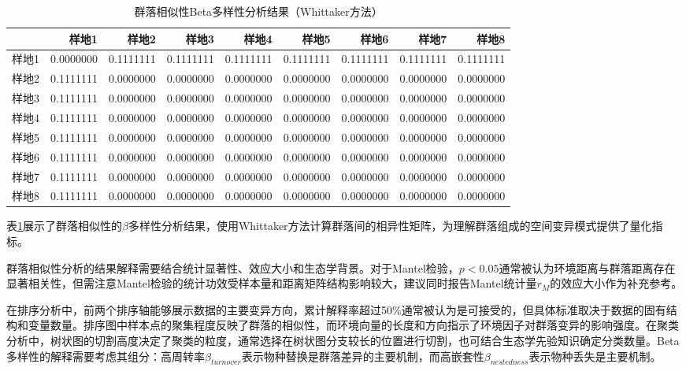 \documentclass[
  twoside,12pt,fontset=none]{ctexbook}
\begin{document}
\begin{table}[!h]
\centering
\caption{\label{tab:beta-diversity-table}群落相似性Beta多样性分析结果（Whittaker方法）}
\centering
\begin{tabular}[t]{lrrrrrrrr}
\toprule
  & 样地1 & 样地2 & 样地3 & 样地4 & 样地5 & 样地6 & 样地7 & 样地8\\
\midrule
样地1 & 0.0000000 & 0.1111111 & 0.1111111 & 0.1111111 & 0.1111111 & 0.1111111 & 0.1111111 & 0.1111111\\
样地2 & 0.1111111 & 0.0000000 & 0.0000000 & 0.0000000 & 0.0000000 & 0.0000000 & 0.0000000 & 0.0000000\\
样地3 & 0.1111111 & 0.0000000 & 0.0000000 & 0.0000000 & 0.0000000 & 0.0000000 & 0.0000000 & 0.0000000\\
样地4 & 0.1111111 & 0.0000000 & 0.0000000 & 0.0000000 & 0.0000000 & 0.0000000 & 0.0000000 & 0.0000000\\
样地5 & 0.1111111 & 0.0000000 & 0.0000000 & 0.0000000 & 0.0000000 & 0.0000000 & 0.0000000 & 0.0000000\\
\addlinespace
样地6 & 0.1111111 & 0.0000000 & 0.0000000 & 0.0000000 & 0.0000000 & 0.0000000 & 0.0000000 & 0.0000000\\
样地7 & 0.1111111 & 0.0000000 & 0.0000000 & 0.0000000 & 0.0000000 & 0.0000000 & 0.0000000 & 0.0000000\\
样地8 & 0.1111111 & 0.0000000 & 0.0000000 & 0.0000000 & 0.0000000 & 0.0000000 & 0.0000000 & 0.0000000\\
\bottomrule
\end{tabular}
\end{table}

表\ref{tab:beta-diversity-table}展示了群落相似性的\(\beta\)多样性分析结果，使用Whittaker方法计算群落间的相异性矩阵，为理解群落组成的空间变异模式提供了量化指标。

群落相似性分析的结果解释需要结合统计显著性、效应大小和生态学背景。对于Mantel检验，\(p < 0.05\)通常被认为环境距离与群落距离存在显著相关性，但需注意Mantel检验的统计功效受样本量和距离矩阵结构影响较大，建议同时报告Mantel统计量\(r_M\)的效应大小作为补充参考。

在排序分析中，前两个排序轴能够展示数据的主要变异方向，累计解释率超过50\%通常被认为是可接受的，但具体标准取决于数据的固有结构和变量数量。排序图中样本点的聚集程度反映了群落的相似性，而环境向量的长度和方向指示了环境因子对群落变异的影响强度。在聚类分析中，树状图的切割高度决定了聚类的粒度，通常选择在树状图分支较长的位置进行切割，也可结合生态学先验知识确定分类数量。Beta多样性的解释需要考虑其组分：高周转率\(\beta_{turnover}\)表示物种替换是群落差异的主要机制，而高嵌套性\(\beta_{nestedness}\)表示物种丢失是主要机制。
\end{document}
